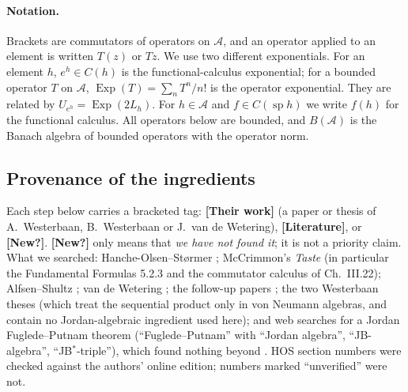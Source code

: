 \documentclass[11pt]{article}
\theoremstyle{remark}
\newcommand{\cA}{\mathcal A}
\DeclareMathOperator{\Exp}{Exp}
\DeclareMathOperator{\spec}{sp}
\begin{document}
\paragraph{Notation.}
Brackets are commutators of operators on $\cA$, and an operator applied
to an element is written $T(z)$ or $Tz$.
We use two different exponentials.
For an element $h$, $e^{h}\in C(h)$ is the functional-calculus exponential;
for a bounded operator $T$ on $\cA$, $\Exp(T) = \sum_n T^n/n!$ is the operator
exponential.
They are related by $U_{e^{h}} = \Exp(2L_h)$.
For $h\in\cA$ and $f\in C(\spec h)$ we write $f(h)$ for the functional calculus.
All operators below are bounded, and $B(\cA)$ is the Banach algebra of bounded
operators with the operator norm.

\subsection{Provenance of the ingredients}\label{sec:prov}
Each step below carries a bracketed tag: \textbf{[Their work]} (a paper or thesis of
A.~Westerbaan, B.~Westerbaan or J.~van de Wetering), \textbf{[Literature]}, or
\textbf{[New?]}. \textbf{[New?]} only means that \emph{we have not found it}; it is not a
priority claim. What we searched: Hanche-Olsen--St{\o}rmer \cite{HOS}; McCrimmon's
\emph{Taste} \cite{McC} (in particular the Fundamental Formulas 5.2.3 and the
commutator calculus of Ch.~III.22); Alfsen--Shultz \cite{AS}; van de Wetering
\cite{vdW,vdW19,vdWFF}; the follow-up papers \cite{WWvdW20,WWvdW21}; the two
Westerbaan theses (which treat the sequential product only in von Neumann algebras, and
contain no Jordan-algebraic ingredient used here); and web searches for a Jordan
Fuglede--Putnam theorem (``Fuglede--Putnam'' with ``Jordan algebra'', ``JB-algebra'',
``JB$^*$-triple''), which found nothing beyond \cite{vdW}. HOS section numbers were
checked against the authors' online edition; numbers marked ``unverified'' were not.
\begingroup\small
\renewcommand{\arraystretch}{1.15}
\end{document}
